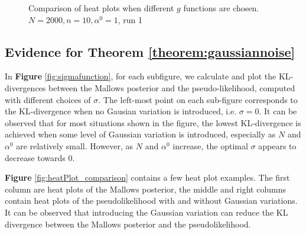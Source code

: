 \documentclass[11pt, oneside]{article}   	%
\begin{document}
\begin{figure}[h!]
\begin{minipage}[t]{.45\textwidth}
		\end{minipage} 

	\caption{Comparison of heat plots when different $g$ functions are chosen. $N = 2000, n = 10, \alpha^0 = 1$, run 1}
	\label{fig:heatPlot_comparison_g}
\end{figure}


\subsection{Evidence for Theorem \ref{theorem:gaussiannoise}}
In \textbf{Figure} \ref{fig:sigmafunction}, for each subfigure, we calculate and plot the KL-divergences between the Mallows posterior and the pseudo-likelihood, computed with different choices of $\sigma$. The left-most point on each sub-figure corresponds to the KL-divergence when no Gausian variation is introduced, i.e. $\sigma = 0$. It can be observed that for most situations shown in the figure, the lowest KL-divergence is achieved when some level of Gaussian variation is introduced, especially as $N$ and $\alpha^0$ are relatively small. However, as $N$ and $\alpha^0$ increase, the optimal $\sigma$ appears to decrease towards 0. 

\textbf{Figure} \ref{fig:heatPlot_comparison} contains a few heat plot examples. The first column are heat plots of the Mallows posterior, the middle and right columns contain heat plots of the pseudolikelihood with and without Gaussian variations. It can be observed that introducing the Gaussian variation can reduce the KL divergence between the Mallows posterior and the pseudolikelihood.
\end{document}
